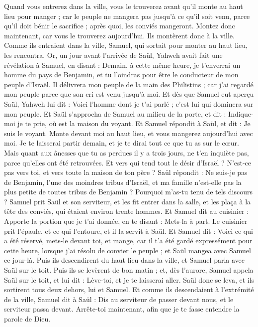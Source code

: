 \begin{multicols}{2}
Quand vous entrerez dans la ville, vous le trouverez avant qu'il monte au haut lieu pour manger ; car le peuple ne mangera pas jusqu'à ce qu'il soit venu, parce qu'il doit bénir le sacrifice ; après quoi, les conviés mangeront. Montez donc maintenant, car vous le trouverez aujourd'hui.
Ils montèrent donc à la ville. Comme ils entraient dans la ville, Samuel, qui sortait pour monter au haut lieu, les rencontra.
Or, un jour avant l’arrivée de Saül, Yahweh avait fait une révélation à Samuel, en disant :
Demain, à cette même heure, je t'enverrai un homme du pays de Benjamin, et tu l'oindras pour être le conducteur de mon peuple d'Israël. Il délivrera mon peuple de la main des Philistins ; car j'ai regardé mon peuple parce que son cri est venu jusqu'à moi.
Et dès que Samuel eut aperçu Saül, Yahweh lui dit : Voici l'homme dont je t'ai parlé ; c'est lui qui dominera sur mon peuple.
Et Saül s'approcha de Samuel au milieu de la porte, et dit : Indique-moi je te prie, où est la maison du voyant.
Et Samuel répondit à Saül, et dit : Je suis le voyant. Monte devant moi au haut lieu, et vous mangerez aujourd'hui avec moi. Je te laisserai partir demain, et je te dirai tout ce que tu as sur le cœur.
Mais quant aux ânesses que tu as perdues il y a trois jours, ne t'en inquiète pas, parce qu'elles ont été retrouvées. Et vers qui tend tout le désir d’Israël ? N’est-ce pas vers toi, et vers toute la maison de ton père ?
Saül répondit : Ne suis-je pas de Benjamin, l’une des moindres tribus d'Israël, et ma famille n'est-elle pas la plus petite de toutes tribus de Benjamin ? Pourquoi m’as-tu tenu de tels discours ?
Samuel prit Saül et son serviteur, et les fit entrer dans la salle, et les plaça à la tête des conviés, qui étaient environ trente hommes.
Et Samuel dit au cuisinier : Apporte la portion que je t'ai donnée, en te disant : Mets-la à part.
Le cuisinier prit l’épaule, et ce qui l’entoure, et il la servit à Saül. Et Samuel dit : Voici ce qui a été réservé, mets-le devant toi, et mange, car il t’a été gardé expressément pour cette heure, lorsque j'ai résolu de convier le peuple ; et Saül mangea avec Samuel ce jour-là.
Puis ils descendirent du haut lieu dans la ville, et Samuel parla avec Saül sur le toit.
Puis ils se levèrent de bon matin ; et, dès l’aurore, Samuel appela Saül sur le toit, et lui dit : Lève-toi, et je te laisserai aller. Saül donc se leva, et ils sortirent tous deux dehors, lui et Samuel.
Et comme ils descendaient à l’extrémité de la ville, Samuel dit à Saül : Dis au serviteur de passer devant nous, et le serviteur passa devant. Arrête-toi maintenant, afin que je te fasse entendre la parole de Dieu.

\end{multicols}
